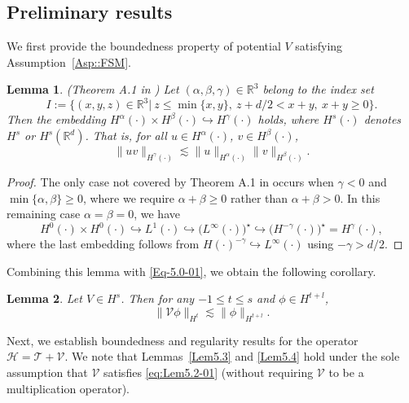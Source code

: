 \documentclass{sn-jnl}%
\numberwithin{equation}{section}
\theoremstyle{thmstyleone}%
\newtheorem{lemma}{Lemma}[section]%
\theoremstyle{thmstyletwo}%
\theoremstyle{thmstylethree}%
\begin{document}
\subsection{Preliminary results}
\label{subsec:proofFM-4}
We first provide the boundedness property of potential $V$ satisfying  Assumption~\ref{Asp::FSM}.
\begin{lemma}\label{Lem5.1}(Theorem A.1 in \cite{behzadan2021multiplication})
    Let $(\alpha,\beta,\gamma) \in \mathbb{R}^3$ belong to the index set
    \[ 
    I:=\bigl\{(x,y,z)\in \mathbb{R}^3|\  z \leq \min\{x,y
    \},\ z+d/2< x+y,\ x+y \geq 0\bigr\}.
    \]
    Then the embedding $H^\alpha(\cdot) \times H^\beta(\cdot) \hookrightarrow H^\gamma(\cdot)$ holds, where $H^{s}(\cdot)$ denotes $H^{s}$ or $H^{s}(\mathbb{R}^d)$. That is,  for all $u \in H^\alpha(\cdot)$, $v \in H^\beta(\cdot)$,
    \begin{equation}
        \|uv\|_{H^\gamma(\cdot)} \lesssim \| u \|_{H^\alpha(\cdot)} \|v\|_{H^\beta(\cdot)}.
    \end{equation}
\end{lemma}
\begin{proof}
The only case not covered by Theorem A.1 in \cite{behzadan2021multiplication} occurs when $\gamma<0$ and $\min\{\alpha,\beta\}\geq 0$, where we require $\alpha+\beta\geq0$ rather than $\alpha+\beta > 0$. In this remaining case $\alpha=\beta=0$, we have 
\[
H^{0}(\cdot)\times H^{0}(\cdot) \hookrightarrow L^{1}(\cdot)\hookrightarrow\bigl(L^{\infty}(\cdot)\bigr)^{\star}\hookrightarrow \bigr(H^{-\gamma}(\cdot)\bigl)^{\star}=H^{\gamma}(\cdot),
\]
where the last embedding follows from  $H(\cdot)^{-\gamma}\hookrightarrow L^{\infty}(\cdot)$ using $-\gamma>d/2$.



\end{proof}

Combining this lemma with \eqref{Eq-5.0-01}, we obtain the following corollary.
\begin{lemma}\label{Lem5.2}
Let $V \in H^s$. Then for any $-1 \leq t \leq s$ and $\phi \in H^{t+l}$,
\begin{equation}\label{eq:Lem5.2-01}
\|\mathcal{V} \phi\|_{H^{t}} \lesssim \|\phi\|_{H^{t+l}}.
\end{equation}
\end{lemma}

Next, we establish boundedness and regularity results for the operator
$\mathcal{H}=\mathcal{T}+\mathcal{V}$. We note that Lemmas~\ref{Lem5.3} and \ref{Lem5.4} hold under the sole assumption that $\mathcal{V}$ satisfies \eqref{eq:Lem5.2-01} (without requiring $\mathcal{V}$ to be a multiplication operator).
\end{document}
